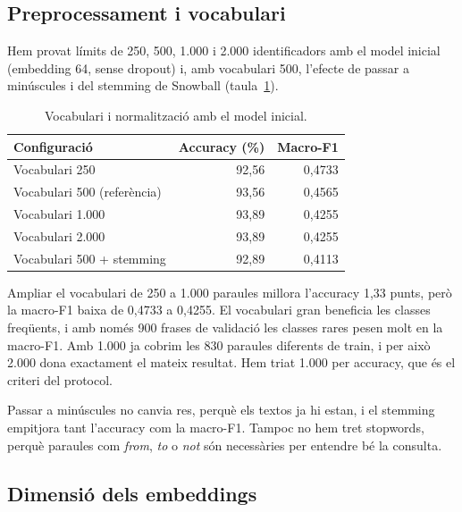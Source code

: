 \documentclass[11pt,a4paper]{article}
\begin{document}
\subsection{Preprocessament i vocabulari}
\label{sec:vocab}

Hem provat límits de 250, 500, 1.000 i 2.000 identificadors amb el model inicial (embedding 64, sense dropout) i,
amb vocabulari 500, l'efecte de passar a minúscules i del stemming de Snowball (taula~\ref{tab:vocab}).

\begin{table}[ht]
\centering\small
\caption{Vocabulari i normalització amb el model inicial.}
\label{tab:vocab}
\begin{tabular}{lrr}
\toprule
Configuració & Accuracy (\%) & Macro-F1\\
\midrule
Vocabulari 250 & 92,56 & 0,4733 \\
Vocabulari 500 (referència) & 93,56 & 0,4565 \\
Vocabulari 1.000 & 93,89 & 0,4255 \\
Vocabulari 2.000 & 93,89 & 0,4255 \\
Vocabulari 500 + stemming & 92,89 & 0,4113 \\
\bottomrule
\end{tabular}
\end{table}

Ampliar el vocabulari de 250 a 1.000 paraules millora l'accuracy 1,33 punts, però la macro-F1 baixa de 0,4733 a
0,4255. El vocabulari gran beneficia les classes freqüents, i amb només 900 frases de validació les classes rares
pesen molt en la macro-F1. Amb 1.000 ja cobrim les 830 paraules diferents de train, i per això 2.000 dona
exactament el mateix resultat. Hem triat 1.000 per accuracy, que és el criteri del protocol.

Passar a minúscules no canvia res, perquè els textos ja hi estan, i el stemming empitjora tant l'accuracy com la
macro-F1. Tampoc no hem tret stopwords, perquè paraules com \emph{from}, \emph{to} o \emph{not} són necessàries
per entendre bé la consulta.

\subsection{Dimensió dels embeddings}
\label{sec:emb}
\end{document}
